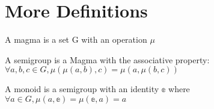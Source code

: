 \section{More Definitions}

\begin{definition}[Magma]
    \label{definition : Magma}
    \leanok
    A magma is a set G with an operation $\mu$
\end{definition}

\begin{definition}[Semigroup]
    \label{definition : Semigroup}
    \leanok
    A semigroup is a Magma with the associative property: $\forall a, b, c \in G, \mu(\mu(a, b), c) = \mu(a, \mu(b, c))$
\end{definition}

\begin{definition}[Monoid]
    \label{definition : Monoid}
    \leanok
    A monoid is a semigroup with an identity $\mathbb{e}$ where $\forall a \in G, \mu (a, \mathbb{e}) = \mu(\mathbb{e}, a) = a$
\end{definition}
